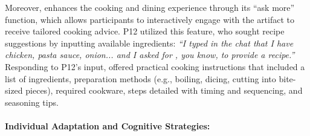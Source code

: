 Moreover, \bma{} enhances the cooking and dining experience through its ``ask more'' function, which allows participants to interactively engage with the artifact to receive tailored cooking advice. P12 utilized this feature, who sought recipe suggestions by inputting available ingredients: \textit{``I typed in the chat that I have chicken, pasta sauce, onion... and I asked for \bma, you know, to provide a recipe.''}
% 
Responding to P12's input, \bma{} offered practical cooking instructions that included a list of ingredients, preparation methods (e.g., boiling, dicing, cutting into bite-sized pieces), required cookware, steps detailed with timing and sequencing, and seasoning tips.








\paragraph{Individual Adaptation and Cognitive Strategies:}


